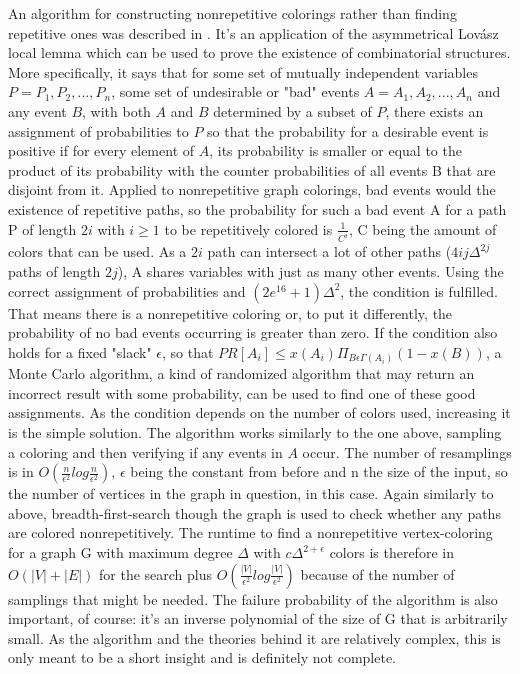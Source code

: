 \documentclass[12pt,a4paper]{article}
\begin{document}
An algorithm for constructing nonrepetitive colorings rather than finding repetitive ones was described in \citep{Haeupler2010}. It's an application of the asymmetrical Lovász local lemma which can be used to prove the existence of combinatorial structures. More specifically, it says that for some set of mutually independent variables $P = {P_1, P_2, ..., P_n}$, some set of undesirable or "bad" events $A = {A_1, A_2, ..., A_n}$ and any event $B$, with both $A$ and $B$ determined by a subset of $P$, there exists an assignment of probabilities to $P$ so that the probability for a desirable event is positive if for every element of $A$, its probability is smaller or equal to the product of its probability with the counter probabilities of all events B that are disjoint from it. Applied to nonrepetitive graph colorings, bad events would the existence of repetitive paths, so the probability for such a bad event A for a path P of length $2i$ with $i \geq 1$ to be repetitively colored is $\frac{1}{C^i}$, C being the amount of colors that can be used. As a $2i$ path can intersect a lot of other paths ($4ij\Delta^{2j}$ paths of length $2j$), A shares variables with just as many other events. Using the correct assignment of probabilities and $(2e^{16}+1)\Delta^2$, the condition is fulfilled. That means there is a nonrepetitive coloring or, to put it differently, the probability of no bad events occurring is greater than zero. If the condition also holds for a fixed "slack" $\epsilon$, so that $PR[A_i] \leq x(A_i) \Pi_{B \epsilon \Gamma(A_i)} (1-x(B))$, a Monte Carlo algorithm, a kind of randomized algorithm that may return an incorrect result with some probability, can be used to find one of these good assignments. As the condition depends on the number of colors used, increasing it is the simple solution. The algorithm works similarly to the one above, sampling a coloring and then verifying if any events in $A$ occur. The number of resamplings is in $O(\frac{n}{\epsilon^2}log\frac{n}{\epsilon^2})$, $\epsilon$ being the constant from before and n the size of the input, so the number of vertices in the graph in question, in this case. Again similarly to above, breadth-first-search though the graph is used to check whether any paths are colored nonrepetitively. The runtime to find a nonrepetitive vertex-coloring for a graph G with maximum degree $\Delta$ with $c\Delta^{2+\epsilon}$ colors is therefore in $O(|V|+|E|)$ for the search plus $O(\frac{|V|}{\epsilon^2}log\frac{|V|}{\epsilon^2})$ because of the number of samplings that might be needed. The failure probability of the algorithm is also important, of course: it's an inverse polynomial of the size of G that is arbitrarily small. As the algorithm and the theories behind it are relatively complex, this is only meant to be a short insight and is definitely not complete.
\end{document}
